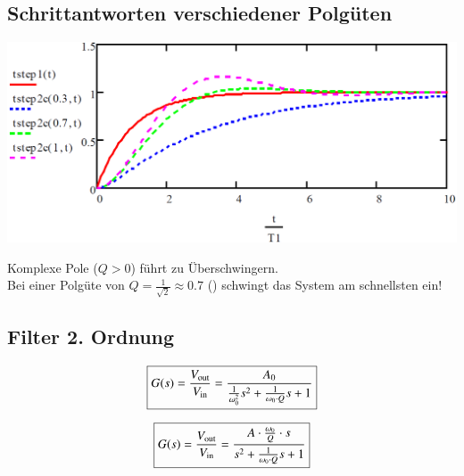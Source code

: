 \subsection{Schrittantworten verschiedener Polgüten}

\begin{minipage}[c]{0.48\columnwidth}
    \includegraphics[width=\columnwidth]{images/schrittantwort_verschiedene_polgueten.png}
\end{minipage}
\hfill
\begin{minipage}[c]{0.48\columnwidth}
    Komplexe Pole ($Q > 0$) führt zu Überschwingern. \\
    Bei einer Polgüte von $Q = \frac{1}{\sqrt{2}} \approx 0.7$ () schwingt das System am schnellsten ein!
\end{minipage}


\subsection{Filter 2. Ordnung}

\begin{minipage}[c]{0.48\columnwidth}
    \begin{center}
    \end{center}
    $$ \boxed{ G(s) = \frac{V_{\rm out}}{V_{\rm in}} = \frac{A_0}{\frac{1}{\omega_0^2} s^2 + \frac{1}{\omega_0 \cdot Q} s + 1 } } $$
\end{minipage}
\hfill
\begin{minipage}[c]{0.48\columnwidth}
    \begin{center}
    \end{center}
    $$ \boxed{ G(s) = \frac{V_{\rm out}}{V_{\rm in}} = \frac{A \cdot \frac{\omega_0}{Q} \cdot s}{s^2 +  \frac{1}{ \omega_0 \cdot Q} s + 1 } } $$
\end{minipage}

